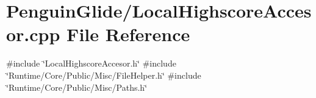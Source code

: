 \section{Penguin\+Glide/\+Local\+Highscore\+Accesor.cpp File Reference}
\label{_local_highscore_accesor_8cpp}
{\ttfamily \#include \char`\"{}Local\+Highscore\+Accesor.\+h\char`\"{}}\newline
{\ttfamily \#include \char`\"{}Runtime/\+Core/\+Public/\+Misc/\+File\+Helper.\+h\char`\"{}}\newline
{\ttfamily \#include \char`\"{}Runtime/\+Core/\+Public/\+Misc/\+Paths.\+h\char`\"{}}\newline
